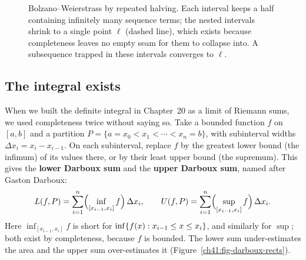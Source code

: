 \begin{figure}[H]
\centering
{}
\caption{Bolzano--Weierstrass by repeated halving. Each interval keeps a half containing
infinitely many sequence terms; the nested intervals shrink to a single point $\ell$
(dashed line), which exists because completeness leaves no empty seam for them to collapse
into. A subsequence trapped in these intervals converges to $\ell$.}
\label{ch41:fig-bw}
\end{figure}

\subsection*{The integral exists}

When we built the definite integral in Chapter~20 as a limit of Riemann sums, we used
completeness twice without saying so. Take a bounded function $f$ on $[a,b]$ and a partition
$P = \{a = x_0 < x_1 < \cdots < x_n = b\}$, with subinterval widths
$\Delta x_i = x_i - x_{i-1}$. On each subinterval, replace $f$ by the greatest lower bound
(the infimum) of its values there, or by their least upper bound (the supremum). This gives the
\textbf{lower Darboux sum} and the \textbf{upper Darboux sum}, named after Gaston Darboux:
\[
  L(f,P) = \sum_{i=1}^n \Bigl(\inf_{[x_{i-1},x_i]} f\Bigr)\,\Delta x_i,
  \qquad
  U(f,P) = \sum_{i=1}^n \Bigl(\sup_{[x_{i-1},x_i]} f\Bigr)\,\Delta x_i .
\]
Here $\inf_{[x_{i-1},x_i]} f$ is short for $\inf\{f(x) : x_{i-1}\le x\le x_i\}$, and similarly
for $\sup$; both exist by completeness, because $f$ is bounded. The lower sum
under-estimates the area and the upper sum over-estimates it
(Figure~\ref{ch41:fig-darboux-rects}).

